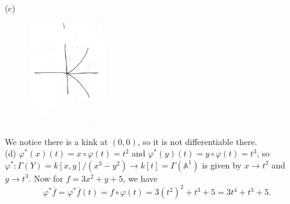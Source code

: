 \documentclass[a4paper]{article}
\begin{document}
    
    (c)

     \begin{figure}[h]
         \centering
         \includegraphics[width=0.3\textwidth]{1c.jpg}
         \label{fig:1c-jpg}
     \end{figure}
     We notice there is a kink at $(0,0)$, so it is not differentiable there.\\

     (d) $\varphi^{*} (x) (t) = x \circ \varphi (t) = t^2$ and
     $\varphi^{*}(y) (t) = y \circ \varphi(t) = t^3$, so
     $\varphi^{*}  \colon \Gamma (Y) = k\left[ x,y \right] / (x^3 - y^2) \to 
     k \left[ t \right]  = \Gamma \left( \mathbb{A}^{1} \right) $ is given by
     $x \to t^2$ and $y \to t^3$. Now
     for $f = 3x^2 + y + 5$, we have
     \[
     \varphi^{*}\overline{f} = \varphi^{*}\overline{f} (t)= f \circ \varphi (t) = 
     3 (t^2)^2 + t^3 + 5 = 3 t^{4} + t^3 + 5.
     \] 
     
\end{document}
